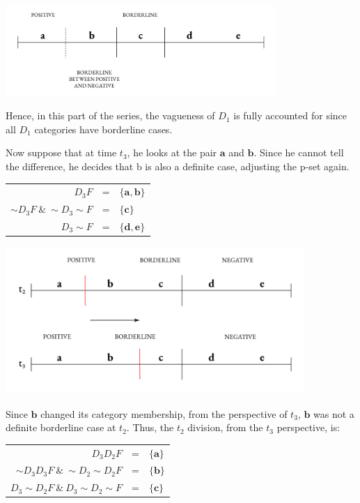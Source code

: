 \begin{center}
\includegraphics[width=0.77\textwidth]{papers/figures/2-4.pdf}
\end{center}
Hence, in this part of the series, the vagueness of \(D_{1}\) is fully
accounted for since all \(D_{1}\) categories have borderline cases.

Now suppose that at time \(t_{3}\), he looks at the pair $\mathbf{a}$ and
$\mathbf{b}$. Since he cannot tell the difference, he decides that b is
also a definite case, adjusting the p-set again.

\begin{center}
\begin{tabulary}{\textwidth}{RCL}
$D_3 F$ & = & $\{ \mathbf{a}, \mathbf{b} \}$ \\
${\sim} D_3F \ \& \ {\sim}D_{3}{\sim}F$ & = & $\{ \mathbf{c} \}$ \\
$D_{3}{\sim} F $ & = & $\{ \mathbf{d}, \mathbf{e} \}$
\end{tabulary}
\end{center}

\begin{center}
    \includegraphics[width=4.46286in,height=2.2071in]{papers/figures/2-5.pdf}
  \end{center}
Since $\mathbf{b}$ changed its category membership, from the perspective
of \(t_{3}\), $\mathbf{b}$ was not a definite borderline case at
\(t_{2}\). Thus, the \(t_{2}\) division, from the \(t_{3}\) perspective,
is:

\begin{center}
\begin{tabulary}{\textwidth}{RCL}
$D_3 D_2 F$ & = & $\{ \mathbf{a} \}$ \\
${\sim}D_3 D_3 F \ \& \ {\sim}D_2 {\sim}D_2 F$ & = & $\{ \mathbf{b} \}$ \\
$D_3 {\sim}D_2 F \ \& \ D_3 {\sim}D_2 {\sim}F$ & = & $\{ \mathbf{c} \}$
\end{tabulary}
\end{center}

